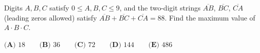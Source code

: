 Digits \(A,B,C\) satisfy \(0\le A,B,C\le 9\), and the two-digit strings \(\overline{AB}\), \(\overline{BC}\), \(\overline{CA}\) (leading zeros allowed) satisfy \(\overline{AB}+\overline{BC}+\overline{CA}=88\). Find the maximum value of \(A\cdot B\cdot C\).

\(\textbf{(A) } 18 \qquad\textbf{(B) } 36 \qquad\textbf{(C) } 72 \qquad\textbf{(D) } 144 \qquad\textbf{(E) } 486\)
